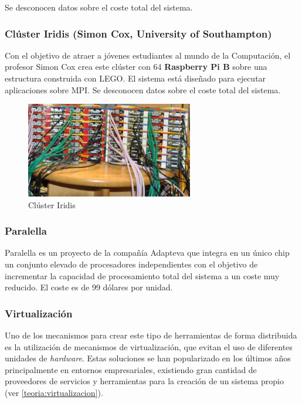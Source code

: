 Se desconocen datos sobre el coste total del sistema.

\subsubsection{Clúster Iridis (Simon Cox, University of Southampton)}

Con el objetivo de atraer a jóvenes estudiantes al mundo de la Computación, el profesor Simon Cox crea este clúster con 64 \textbf{Raspberry Pi B} sobre una estructura construida con LEGO\cite{cox:raspberry}. El sistema está diseñado para ejecutar aplicaciones sobre MPI. Se desconocen datos sobre el coste total del sistema.

\begin{figure}[H]
	\centering
	\includegraphics[width=0.65\textwidth]{Chapters/Chapter1/Figures/iridis-pi.jpg}
	\caption[Iridis]{Clúster Iridis}
	\label{cox:iridis}
\end{figure}

\subsubsection{Paralella}

Paralella es un proyecto de la compañía Adapteva que integra en un único chip un conjunto elevado de procesadores independientes con el objetivo de incrementar la capacidad de procesamiento total del sistema a un coste muy reducido\cite{paralella}. El coste es de 99 dólares por unidad.

\subsubsection{Virtualización}

Uno de los mecanismos para crear este tipo de herramientas de forma distribuida es la utilización de mecanismos de virtualización, que evitan el uso de diferentes unidades de \textit{hardware}. Estas soluciones se han popularizado en los últimos años principalmente en entornos empresariales, existiendo gran cantidad de proveedores de servicios y herramientas para la creación de un sistema propio (ver \ref{teoria:virtualizacion}).


